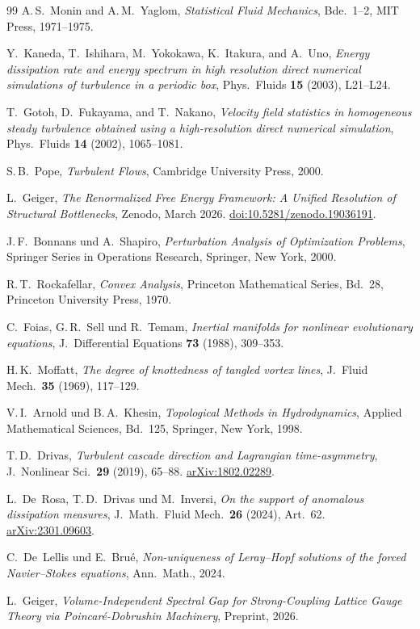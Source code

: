 \documentclass[12pt,a4paper]{article}
\theoremstyle{definition}
\theoremstyle{plain}
\theoremstyle{remark}
\begin{document}
\begin{thebibliography}{99}
A.\,S.~Monin and A.\,M.~Yaglom,
\emph{Statistical Fluid Mechanics}, Bde.~1--2,
MIT Press, 1971--1975.

Y.~Kaneda, T.~Ishihara, M.~Yokokawa, K.~Itakura, and A.~Uno,
\emph{Energy dissipation rate and energy spectrum in high resolution
direct numerical simulations of turbulence in a periodic box},
Phys.\ Fluids \textbf{15} (2003), L21--L24.

T.~Gotoh, D.~Fukayama, and T.~Nakano,
\emph{Velocity field statistics in homogeneous steady turbulence
obtained using a high-resolution direct numerical simulation},
Phys.\ Fluids \textbf{14} (2002), 1065--1081.

S.\,B.~Pope,
\emph{Turbulent Flows},
Cambridge University Press, 2000.

L.~Geiger, \emph{The Renormalized Free Energy Framework: A Unified Resolution of Structural Bottlenecks},
Zenodo, March 2026.
\href{https://doi.org/10.5281/zenodo.19036191}{doi:10.5281/zenodo.19036191}.

J.\,F.~Bonnans und A.~Shapiro,
\emph{Perturbation Analysis of Optimization Problems},
Springer Series in Operations Research, Springer, New York, 2000.

R.\,T.~Rockafellar,
\emph{Convex Analysis},
Princeton Mathematical Series, Bd.~28,
Princeton University Press, 1970.

C.~Foias, G.\,R.~Sell und R.~Temam,
\emph{Inertial manifolds for nonlinear evolutionary equations},
J.~Differential Equations \textbf{73} (1988), 309--353.

H.\,K.~Moffatt,
\emph{The degree of knottedness of tangled vortex lines},
J.~Fluid Mech.\ \textbf{35} (1969), 117--129.

V.\,I.~Arnold und B.\,A.~Khesin,
\emph{Topological Methods in Hydrodynamics},
Applied Mathematical Sciences, Bd.~125,
Springer, New York, 1998.

T.\,D.~Drivas,
\emph{Turbulent cascade direction and Lagrangian time-asymmetry},
J.~Nonlinear Sci.\ \textbf{29} (2019), 65--88.
\href{https://arxiv.org/abs/1802.02289}{arXiv:1802.02289}.

L.~De~Rosa, T.\,D.~Drivas und M.~Inversi,
\emph{On the support of anomalous dissipation measures},
J.~Math.\ Fluid Mech.\ \textbf{26} (2024), Art.~62.
\href{https://arxiv.org/abs/2301.09603}{arXiv:2301.09603}.

C.~De~Lellis und E.~Bru\'e, \textit{Non-uniqueness of Leray--Hopf solutions of the forced Navier--Stokes equations}, Ann.~Math., 2024.

L.~Geiger, \textit{Volume-Independent Spectral Gap for Strong-Coupling Lattice Gauge Theory via Poincar\'e-Dobrushin Machinery}, Preprint, 2026.

\end{thebibliography}
\end{document}
